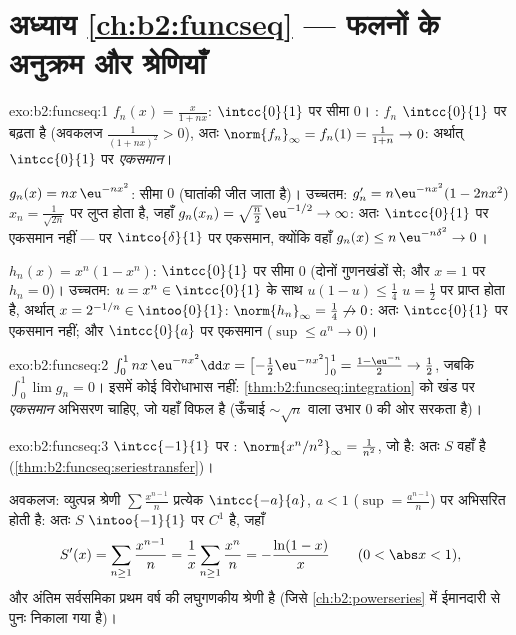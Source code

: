 \section*{अध्याय \ref{ch:b2:funcseq} --- फलनों के अनुक्रम और
श्रेणियाँ}

\begin{solution}{exo:b2:funcseq:1}
$f_n(x) = \frac{x}{1 + nx}$: $\intcc{0}{1}$ पर  सीमा $0$। : $f_n$ $\intcc{0}{1}$ पर बढ़ता है (अवकलज
$\frac{1}{(1+nx)^2} > 0$), अतः $\norm{f_n}_\infty = f_n(1) =
\frac{1}{1+n} \to 0$: अर्थात् $\intcc{0}{1}$ पर \emph{एकसमान}।

$g_n(x) = nx\,\eu^{-nx^2}$:  सीमा $0$ (घातांकी जीत जाता है)। उच्चतम: $g_n' = n\eu^{-nx^2}(1 - 2nx^2)$ $x_n =
\frac{1}{\sqrt{2n}}$ पर लुप्त
होता है, जहाँ $g_n(x_n) = \sqrt{\frac n2}\,\eu^{-1/2}
\to \infty$: अतः $\intcc{0}{1}$ पर एकसमान नहीं --- पर $\intco{\delta}{1}$ पर एकसमान, क्योंकि
वहाँ $g_n(x) \leq n\,\eu^{-n\delta^2}
\to 0$।

$h_n(x) = x^n(1 - x^n)$: $\intcc{0}{1}$ पर  सीमा $0$ (दोनों गुणनखंडों से; और $x = 1$ पर $h_n = 0$)।
उच्चतम: $u = x^n \in
\intcc{0}{1}$ के साथ $u(1-u) \leq \frac14$ $u = \frac12$ पर प्राप्त होता है, अर्थात् $x = 2^{-1/n} \in \intoo{0}{1}$: $\norm{h_n}_\infty =
\frac14 \not\to 0$: अतः $\intcc{0}{1}$
पर एकसमान नहीं; और $\intcc{0}{a}$ पर एकसमान ($\sup \leq a^n \to 0$)।
\end{solution}

\begin{solution}{exo:b2:funcseq:2}
$\int_0^1 nx\,\eu^{-nx^2}\dd x = \bigl[-\tfrac12
\eu^{-nx^2}\bigr]_0^1 = \frac{1 - \eu^{-n}}{2} \to \frac12$, जबकि $\int_0^1 \lim g_n = 0$। इसमें कोई विरोधाभास नहीं: \cref{thm:b2:funcseq:integration} को खंड पर \emph{एकसमान}
अभिसरण चाहिए, जो यहाँ विफल है (ऊँचाई $\sim\sqrt n$ वाला उभार $0$ की ओर सरकता है)।
\end{solution}

\begin{solution}{exo:b2:funcseq:3}
$\intcc{-1}{1}$ पर : $\norm{x^n/n^2}_\infty =
\frac{1}{n^2}$, जो  है: अतः $S$ वहाँ  है (\cref{thm:b2:funcseq:seriestransfer})।

अवकलज: व्युत्पन्न श्रेणी $\sum \frac{x^{n-1}}{n}$ प्रत्येक $\intcc{-a}{a}$, $a < 1$ ($\sup =
\frac{a^{n-1}}{n}$) पर 
अभिसरित होती है: अतः $S$ $\intoo{-1}{1}$ पर $C^1$ है, जहाँ
\[
S'(x) = \sum_{n\geq1} \frac{x^{n-1}}{n} = \frac1x \sum_{n\geq1}
\frac{x^n}{n} = -\frac{\ln(1 - x)}{x}
\qquad (0 < \abs x < 1),
\]
और अंतिम सर्वसमिका प्रथम वर्ष की लघुगणकीय श्रेणी है (जिसे \cref{ch:b2:powerseries} में
ईमानदारी से पुनः निकाला गया है)।
\end{solution}

